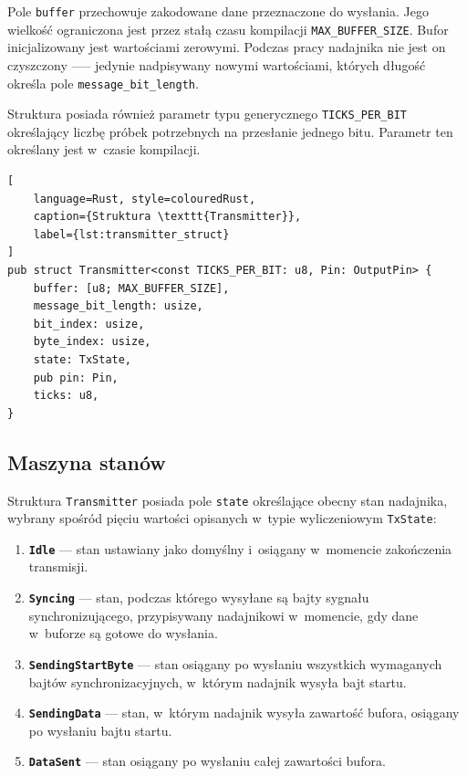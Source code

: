 Pole \texttt{buffer} przechowuje zakodowane dane przeznaczone do wysłania.
Jego wielkość ograniczona jest przez stałą czasu kompilacji 
\texttt{MAX\_BUFFER\_SIZE}. Bufor inicjalizowany jest wartościami zerowymi. 
Podczas pracy nadajnika nie jest on czyszczony —-- jedynie nadpisywany nowymi 
wartościami, których długość określa pole \texttt{message\_bit\_length}.

Struktura posiada również parametr typu generycznego \texttt{TICKS\_PER\_BIT}
określający liczbę próbek potrzebnych na przesłanie jednego bitu. Parametr ten
określany jest w~czasie kompilacji.

\begin{lstlisting}[
    language=Rust, style=colouredRust, 
    caption={Struktura \texttt{Transmitter}},
    label={lst:transmitter_struct}
]
pub struct Transmitter<const TICKS_PER_BIT: u8, Pin: OutputPin> {
    buffer: [u8; MAX_BUFFER_SIZE],
    message_bit_length: usize,
    bit_index: usize,
    byte_index: usize,
    state: TxState,
    pub pin: Pin,
    ticks: u8,
}
\end{lstlisting}

\subsection{Maszyna stanów}
Struktura \texttt{Transmitter} posiada pole \texttt{state} określające obecny 
stan nadajnika, wybrany spośród pięciu wartości opisanych w~typie wyliczeniowym
\texttt{TxState}:
\begin{enumerate}
    \item \textbf{\texttt{Idle}} --- stan ustawiany jako domyślny i~osiągany
    w~momencie zakończenia transmisji.

    \item \textbf{\texttt{Syncing}} --- stan, podczas którego wysyłane są bajty 
    sygnału synchronizującego, przypisywany nadajnikowi w~momencie, gdy dane 
    w~buforze są gotowe do wysłania.
    
    \item \textbf{\texttt{SendingStartByte}} --- stan osiągany po wysłaniu wszystkich
    wymaganych bajtów synchronizacyjnych, w~którym nadajnik wysyła bajt startu.
    
    \item \textbf{\texttt{SendingData}} --- stan, w~którym nadajnik wysyła
    zawartość bufora, osiągany po wysłaniu bajtu startu.
    
    \item \textbf{\texttt{DataSent}} --- stan osiągany po wysłaniu całej zawartości
    bufora.
\end{enumerate}

